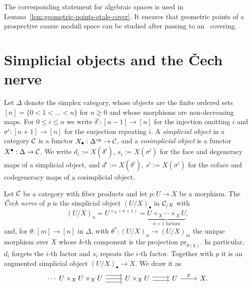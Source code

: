 \begin{remark}
	The corresponding statement for algebraic spaces
	is used in Lemma~\ref{lem:geometric-points-etale-cover}.
	It ensures that geometric points of a prospective
	coarse moduli space can be studied after passing
	to an \etale\ covering.
\end{remark}


\section{Simplicial objects and the \v{C}ech nerve}


\begin{definition}\label{def:simplicial-objects}
	Let $\Delta$ denote the simplex category, whose objects are the finite ordered sets $[n]=\{0<1<\dots<n\}$ for $n\geq 0$ and whose morphisms are non-decreasing maps. For $0\le i\le n$ we write $\delta^i:[n-1]\to[n]$ for the injection omitting $i$ and $\sigma^i:[n+1]\to[n]$ for the surjection repeating $i$.
	A \emph{simplicial object} in a category $\mathcal{C}$ is a functor $X_\bullet:\Delta^{\mathrm{op}}\to\mathcal{C}$, and a \emph{cosimplicial object} is a functor $X^\bullet:\Delta\to\mathcal{C}$. We write $d_i:=X(\delta^i)$, $s_i:=X(\sigma^i)$ for the face and degeneracy maps of a simplicial object, and $d^i:=X(\delta^i)$, $s^i:=X(\sigma^i)$ for the coface and codegeneracy maps of a cosimplicial object.
\end{definition}

\begin{definition}\label{def:cech-nerve}
	Let $\mathcal{C}$ be a category with fiber products and let $p:U\to X$ be a morphism. The \emph{\v{C}ech nerve} of $p$ is the simplicial object $(U/X)_\bullet$ in $\mathcal{C}_{/X}$ with
	\[
	(U/X)_n = U^{\times_X(n+1)} = \underbrace{U\times_X\cdots\times_X U}_{n+1\text{ factors}},
	\]
	and, for $\theta:[m]\to[n]$ in $\Delta$, with $\theta^*:(U/X)_n\to(U/X)_m$ the unique morphism over $X$ whose $k$-th component is the projection $\mathrm{pr}_{\theta(k)}$. In particular, $d_i$ forgets the $i$-th factor and $s_i$ repeats the $i$-th factor. Together with $p$ it is an augmented simplicial object $(U/X)_\bullet\to X$.
	We draw it as
	\[
	\begin{tikzcd}
		\cdots\ U\times_X U\times_X U
		\arrow[r, shift left=2] \arrow[r] \arrow[r, shift right=2]
		& U\times_X U
		\arrow[r, shift left=1] \arrow[r, shift right=1]
		& U \arrow[r, "p"] & X .
	\end{tikzcd}
	\]
\end{definition}

